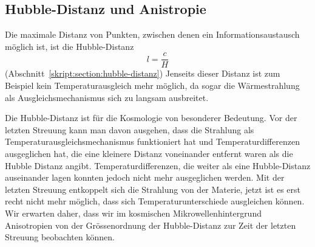 \subsection{Hubble-Distanz und Anistropie}
Die maximale Distanz von Punkten, zwischen denen ein Informationsaustausch
möglich ist, ist die Hubble-Distanz
\begin{equation}
l = \frac{c}{H}
\end{equation}
(Abschnitt~\ref{skript:section:hubble-distanz})
%
Jenseits dieser Distanz ist zum Beispiel kein Temperaturausgleich mehr
möglich, da sogar die Wärmestrahlung als Ausgleichsmechanismus sich zu
langsam ausbreitet.

Die Hubble-Distanz ist für die Kosmologie von besonderer Bedeutung.
Vor der letzten Streuung kann man davon ausgehen, dass die Strahlung
als Temperaturausgleichsmechanismus funktioniert hat und Temperaturdifferenzen
ausgeglichen hat,
die eine kleinere Distanz voneinander entfernt waren als die Hubble Distanz
angibt.
Temperaturdifferenzen, die weiter als eine Hubble-Distanz auseinander lagen
konnten jedoch nicht mehr ausgeglichen werden.
Mit der letzten Streuung entkoppelt sich die Strahlung von der Materie,
jetzt ist es erst recht nicht mehr möglich, dass sich Temperaturunterschiede
ausgleichen können.
Wir erwarten daher, dass wir im kosmischen Mikrowellenhintergrund
Anisotropien von der Grössenordnung der Hubble-Distanz zur Zeit der
letzten Streuung beobachten können.

